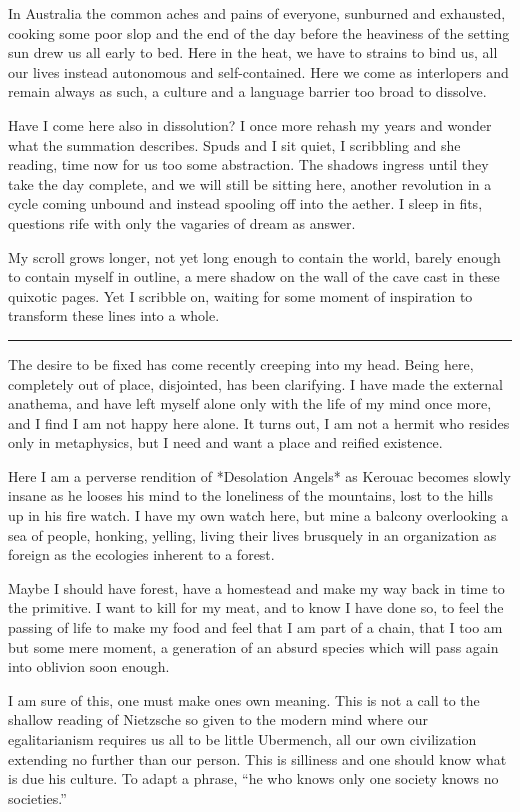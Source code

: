 \documentclass[ebook, 10pt, openright, onecolumn]{memoir}
\newcommand*\starbreak{\fancybreak*{\Large{* * *}}}
\begin{document}
In Australia the common aches and pains of everyone, sunburned and exhausted,
cooking some poor slop and the end of the day before the heaviness of the
setting sun drew us all early to bed.  Here in the heat, we have to strains to
bind us, all our lives instead autonomous and self-contained.  Here we come as
interlopers and remain always as such, a culture and a language barrier too
broad to dissolve.

Have I come here also in dissolution?  I once more rehash my years and wonder
what the summation describes.  Spuds and I sit quiet, I scribbling and she
reading, time now for us too some abstraction.  The shadows ingress until they
take the day complete, and we will still be sitting here, another revolution in
a cycle coming unbound and instead spooling off into the aether.  I sleep in
fits, questions rife with only the vagaries of dream as answer.

My scroll grows longer, not yet long enough to contain the world, barely enough
to contain myself in outline, a mere shadow on the wall of the cave cast in
these quixotic pages.  Yet I scribble on, waiting for some moment of inspiration
to transform these lines into a whole.

\starbreak

The desire to be fixed has come recently creeping into my head.  Being here,
completely out of place, disjointed, has been clarifying.  I have made the
external anathema, and have left myself alone only with the life of my mind once
more, and I find I am not happy here alone.  It turns out, I am not a hermit who
resides only in metaphysics, but I need and want a place and reified existence.

Here I am a perverse rendition of *Desolation Angels* as Kerouac becomes slowly
insane as he looses his mind to the loneliness of the mountains, lost to the
hills up in his fire watch.  I have my own watch here, but mine a balcony
overlooking a sea of people, honking, yelling, living their lives brusquely in
an organization as foreign as the ecologies inherent to a forest.

Maybe I should have forest, have a homestead and make my way back in time to the
primitive.  I want to kill for my meat, and to know I have done so, to feel the
passing of life to make my food and feel that I am part of a chain, that I too
am but some mere moment, a generation of an absurd species which will pass again
into oblivion soon enough.

I am sure of this, one must make ones own meaning.  This is not a call to the
shallow reading of Nietzsche so given to the modern mind where our
egalitarianism requires us all to be little Ubermench, all our own civilization
extending no further than our person.  This is silliness and one should know
what is due his culture.  To adapt a phrase, ``he who knows only one society knows
no societies.''
\end{document}
